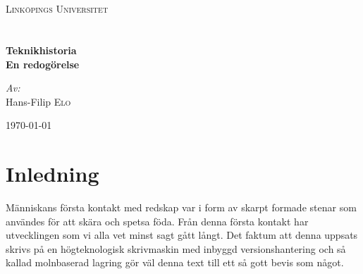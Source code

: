 \documentclass[a4paper,12pt,fleqn]{article}
\begin{document}
\onehalfspacing

\begin{titlepage}
\begin{center}


~\\
~\\
\textsc{\LARGE Link{\"o}pings Universitet}\\[1.5cm]


~\\
~\\
{ \huge \bfseries Teknikhistoria \\ En redogörelse \\[0.4cm] }

\large
\emph{Av:}\\
Hans-Filip \textsc{Elo}

\vfill

{\large \today}

\end{center}


\newpage
\thispagestyle{empty}
\tableofcontents

\newpage
\listoffigures

\end{titlepage}

\pagestyle{fancy}

\fancyhead{} %


\section{Inledning}

Människans första kontakt med redskap var i form av skarpt formade stenar som användes för att skära och spetsa föda. Från denna första kontakt har utvecklingen som vi alla vet minst sagt gått långt. Det faktum att denna uppsats skrivs på en högteknologisk skrivmaskin med inbyggd versionshantering och så kallad molnbaserad lagring gör väl denna text till ett så gott bevis som något. 
\end{document}
